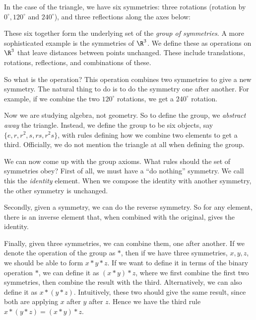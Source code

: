 \documentclass[a4paper]{article}
\begin{document}
In the case of the triangle, we have six symmetries: three rotations (rotation by $0^\circ, 120^\circ$ and $240^\circ$), and three reflections along the axes below:
\begin{center}
\end{center}
These six together form the underlying set of the \emph{group of symmetries}. A more sophisticated example is the symmetries of $\R^3$. We define these as operations on $\R^3$ that leave distances between points unchanged. These include translations, rotations, reflections, and combinations of these.

So what is the operation? This operation combines two symmetries to give a new symmetry. The natural thing to do is to do the symmetry one after another. For example, if we combine the two $120^\circ$ rotations, we get a $240^\circ$ rotation.

Now we are studying algebra, not geometry. So to define the group, we \emph{abstract away} the triangle. Instead, we define the group to be six objects, say $\{e, r, r^2, s, rs, r^2s\}$, with rules defining how we combine two elements to get a third. Officially, we do not mention the triangle at all when defining the group.

We can now come up with the group axioms. What rules should the set of symmetries obey? First of all, we must have a ``do nothing'' symmetry. We call this the \emph{identity} element. When we compose the identity with another symmetry, the other symmetry is unchanged.

Secondly, given a symmetry, we can do the reverse symmetry. So for any element, there is an inverse element that, when combined with the original, gives the identity.

Finally, given three symmetries, we can combine them, one after another. If we denote the operation of the group as $*$, then if we have three symmetries, $x, y, z$, we should be able to form $x*y*z$. If we want to define it in terms of the binary operation $*$, we can define it as $(x*y)*z$, where we first combine the first two symmetries, then combine the result with the third. Alternatively, we can also define it as $x*(y*z)$. Intuitively, these two should give the same result, since both are applying $x$ after $y$ after $z$. Hence we have the third rule $x*(y*z) = (x*y)*z$.
\end{document}
